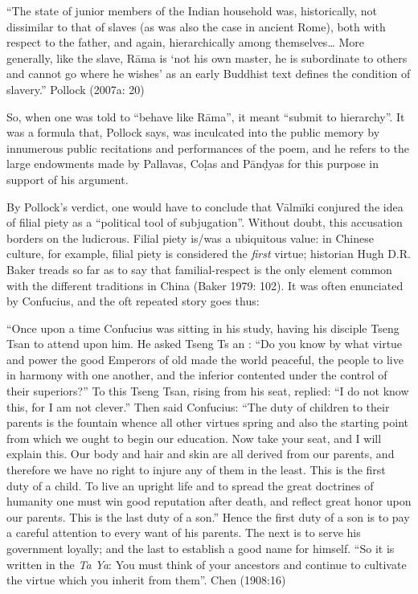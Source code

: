 \begin{myquote}
“The state of junior members of the Indian household was, historically, not dissimilar to that of slaves (as was also the case in ancient Rome), both with respect to the father, and again, hierarchically among themselves… More generally, like the slave, Rāma is ‘not his own master, he is subordinate to others and cannot go where he wishes’ as an early Buddhist text defines the condition of slavery.” 				                                        
\hfill Pollock (2007a: 20)
\end{myquote}

So, when one was told to “behave like Rāma”, it meant “submit to hierarchy”. It was a formula that, Pollock says, was inculcated into the public memory by innumerous public recitations and performances of the poem, and he refers to the large endowments made by Pallavas, Coḷas and Pānḍyas for this purpose in support of his argument.

\newpage

By Pollock’s verdict, one would have to conclude that Vālmīki conjured the idea of filial piety as a “political tool of subjugation”. Without doubt, this accusation borders on the ludicrous. Filial piety is/was a ubiquitous value: in Chinese culture, for example, filial piety is considered the {\sl first} virtue; historian Hugh D.R. Baker treads so far as to say that familial-respect is the only element common with the different traditions in China (Baker 1979: 102). It was often enunciated by Confucius, and the oft repeated story goes thus: 

\begin{myquote}
“Once upon a time Confucius was sitting in his study, having his disciple Tseng Tsan to attend upon him. He asked Tseng Ts an : “Do you know by what virtue and power the good Emperors of old made the world peaceful, the people to live in harmony with one another, and the inferior contented under the control of their superiors?” To this Tseng Tsan, rising from his seat, replied: “I do not know this, for I am not clever.” Then said Confucius: “The duty of children to their parents is the fountain whence all other virtues spring and also the starting point from which we ought to begin our education. Now take your seat, and I will explain this. Our body and hair and skin are all derived from our parents, and therefore we have no right to injure any of them in the least. This is the first duty of a child. To live an upright life and to spread the great doctrines of humanity one must win good reputation after death, and reflect great honor upon our parents. This is the last duty of a son.” Hence the first duty of a son is to pay a careful attention to every want of his parents. The next is to serve his government loyally; and the last to establish a good name for himself. “So it is written in the {\sl Ta Ya}: You must think of your ancestors and continue to cultivate the virtue which you inherit from them”.
\hfill Chen (1908:16)	 
\end{myquote}

